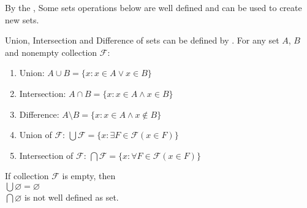 By the , Some sets operations below are well defined and can be used to create new sets.

\begin{corollary}{}{}
    Union, Intersection and Difference of sets can be defined by . For any set $A$, $B$ and nonempty collection $\mathcal{F}$:
    \begin{enumerate}
        \item Union: $A \cup B = \{x: x \in A \lor x \in B\} $ 
        \item Intersection: $A \cap B = \{x: x \in A \land x \in B\}$
        \item Difference: $A \setminus B = \{x: x \in A \land x \notin B\}$
        \item Union of $\mathcal{F}$: $\bigcup \mathcal{F} = \{x: \exists F \in \mathcal{F}(x\in F)\}$
        \item Intersection of $\mathcal{F}$: $\bigcap \mathcal{F} = \{x: \forall F \in \mathcal{F}(x\in F)\}$
    \end{enumerate}
\end{corollary}

\begin{remark}
    If collection $\mathcal{F}$ is empty, then\\
    $\bigcup \varnothing = \varnothing$ \\
    $\bigcap \varnothing$ is not well defined as set.

\end{remark}

